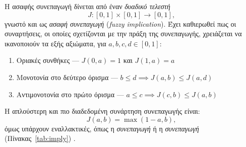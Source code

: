 Η ασαφής συνεπαγωγή δίνεται από έναν \textit{δυαδικό τελεστή}
\[
J : [0,1]\times[0,1] \to [0,1],
\]
γνωστό και ως \textit{ασαφή συνεπαγωγή} (\textit{fuzzy implication}).
Έχει καθιερωθεί πως οι συναρτήσεις, οι οποίες σχετίζονται με την πράξη της συνεπαγωγής, χρειάζεται να ικανοποιούν τα εξής αξιώματα, για \(a,b,c,d \in [0,1]\):
\begin{enumerate}[label=(\textbf{\en{I}\arabic*)}, align=left, leftmargin=1em]
    \item Οριακές συνθήκες --- \(J(0,a) = 1\) και \(J(1,a) = a\)
    \item Μονοτονία στο δεύτερο όρισμα --- \(b \leq d \implies J(a,b) \leq J(a,d)\)
    \item Αντιμονοτονία στο πρώτο όρισμα --- \(a \leq c \implies J(c,b) \leq J(a,b)\)
\end{enumerate}

Η απλούστερη και πιο διαδεδομένη συνάρτηση συνεπαγωγής είναι:
\begin{equation}
    J(a,b) = \max(1-a,b),
\end{equation}
όμως υπάρχουν εναλλακτικές, όπως η \textit{συνεπαγωγή } ή η \textit{συνεπαγωγή } (Πίνακας~\ref{tab:imply}) \cite{Zadeh1965,KlirYuan,Ross2010}.

